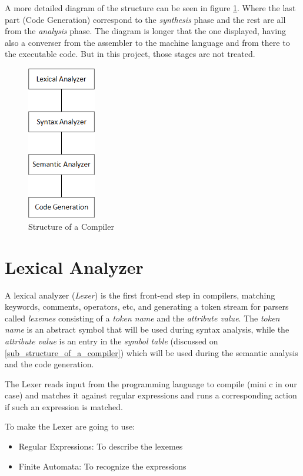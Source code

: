 \documentclass[conference]{IEEEtran}
\theoremstyle{definition}
\begin{document}
A more detailed diagram of the structure can be seen in figure \ref{fig_struct_of_compilator}. Where the last part (Code Generation) correspond to the \textit{synthesis} phase and the rest are all from the \textit{analysis} phase. The diagram is longer that the one displayed, having also a converser from the assembler to the machine language and from there to the executable code. But in this project, those stages are not treated.

\begin{figure}[H]
\centering
\includegraphics[width=3cm]{images/Diagram.png}
\caption{Structure of a Compiler}
\label{fig_struct_of_compilator}
\end{figure}

\section{Lexical Analyzer} \label{sec:lexical-Analizer}
A lexical analyzer (\textit{Lexer}) is the first front-end step in compilers, matching keywords, comments, operators, etc, and generating a token stream for parsers called \textit{lexemes} consisting of a \textit{token name} and the \textit{attribute value}. 
The \textit{token name} is an abstract symbol that will be used during syntax analysis, while the \textit{attribute value} is an entry in the \textit{symbol table} (discussed on \ref{sub_structure_of_a_compiler}) which will be used during the semantic analysis and the code generation.

The Lexer reads input from the programming language to compile (mini c in our case) and matches it against regular expressions and runs a corresponding action if such an expression is matched.

To make the Lexer are going to use:
\begin{itemize}
	\item Regular Expressions: To describe the lexemes
	\item Finite Automata: To recognize the expressions
\end{itemize}
\end{document}
